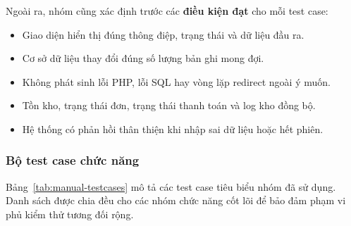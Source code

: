\documentclass[11pt, a4paper]{article}
\begin{document}
Ngoài ra, nhóm cũng xác định trước các \textbf{điều kiện đạt} cho mỗi test case:

\begin{itemize}[leftmargin=*]
    \item Giao diện hiển thị đúng thông điệp, trạng thái và dữ liệu đầu ra.
    \item Cơ sở dữ liệu thay đổi đúng số lượng bản ghi mong đợi.
    \item Không phát sinh lỗi PHP, lỗi SQL hay vòng lặp redirect ngoài ý muốn.
    \item Tồn kho, trạng thái đơn, trạng thái thanh toán và log kho đồng bộ.
    \item Hệ thống có phản hồi thân thiện khi nhập sai dữ liệu hoặc hết phiên.
\end{itemize}

\subsubsection{Bộ test case chức năng}

Bảng~\ref{tab:manual-testcases} mô tả các test case tiêu biểu nhóm đã sử dụng.
Danh sách được chia đều cho các nhóm chức năng cốt lõi để bảo đảm phạm vi phủ
kiểm thử tương đối rộng.
\end{document}
